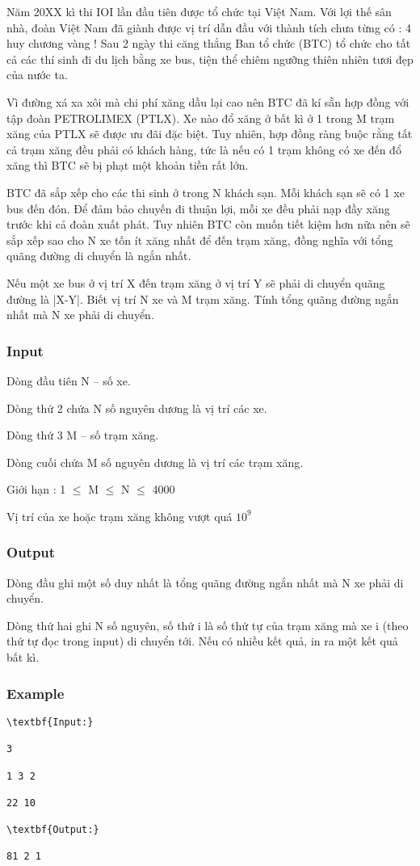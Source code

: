 



   Năm 20XX kì thi IOI lần đầu tiên được tổ chức tại Việt Nam. Với lợi thế sân nhà, đoàn Việt Nam đã giành được vị trí dẫn đầu với thành tích chưa từng có : 4 huy chương vàng ! Sau 2 ngày thi căng thẳng Ban tổ chức (BTC) tổ chức cho tất cả các thí sinh đi du lịch bằng xe bus, tiện thể chiêm ngưỡng thiên nhiên tươi đẹp của nước ta.  

   Vì đường xá xa xôi mà chi phí xăng dầu lại cao nên BTC đã kí sẵn hợp đồng với tập đoàn PETROLIMEX (PTLX). Xe nào đổ xăng ở bất kì ở 1 trong M trạm xăng của PTLX sẽ được ưu đãi đặc biệt. Tuy nhiên, hợp đồng ràng buộc rằng tất cả trạm xăng đều phải có khách hàng, tức là nếu có 1 trạm không có xe đến đổ xăng thì BTC sẽ bị phạt một khoản tiền rất lớn.  

   BTC đã sắp xếp cho các thi sinh ở trong N khách sạn. Mỗi khách sạn sẽ có 1 xe bus đến đón. Để đảm bảo chuyến đi thuận lợi, mỗi xe đều phải nạp đầy xăng trước khi cả đoàn xuất phát. Tuy nhiên BTC còn muốn tiết kiệm hơn nữa nên sẽ sắp xếp sao cho N xe tốn ít xăng nhất để đến trạm xăng, đồng nghĩa với tổng quãng đường di chuyển là ngắn nhất.  

   Nếu một xe bus ở vị trí X đến trạm xăng ở vị trí Y sẽ phải di chuyển quãng đường là |X-Y|. Biết vị trí N xe và M trạm xăng. Tính tổng quãng đường ngắn nhất mà N xe phải di chuyển.  

\subsubsection{   Input  }

   Dòng đầu tiên N – số xe.   


   Dòng thứ 2 chứa N số nguyên dương là vị trí các xe.   


   Dòng thứ 3 M – số trạm xăng.   


   Dòng cuối chứa M số nguyên dương là vị trí các trạm xăng.  

    Giới hạn :      1 $\le$  M  $\le$  N  $\le$  4000   


   Vị trí của xe hoặc trạm xăng không vượt quá $10^{9}$

\subsubsection{   Output  }

   Dòng đầu ghi một số duy nhất là tổng quãng đường ngắn nhất mà N xe phải di chuyển.   


   Dòng thứ hai ghi N số nguyên, số thứ i là số thứ tự của trạm xăng mà xe i (theo thứ tự đọc trong input) di chuyển tới. Nếu có nhiều kết quả, in ra một kết quả bất kì.  

\subsubsection{   Example  }
\begin{verbatim}
\textbf{Input:}

3

1 3 2

22 10

\textbf{Output:}

81 2 1 \end{verbatim}
